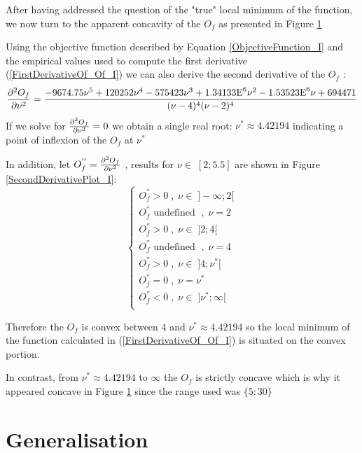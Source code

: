 After having addressed the question of the "true" local minimum of the function, we now turn to the apparent concavity of the $O_f$ as presented in Figure \ref{} \bigskip\par
Using the objective function described by Equation \ref{ObjectiveFunction_I} and the empirical values used to compute the first derivative (\ref{FirstDerivativeOf_Of_I}) we can also derive the second derivative of the $O_f$ :
\begin{equation}\label{SecondDerivativeOf_Of_I}
    \pdv[2]{O_f}{\nu} =  \frac{-9674.75 \nu^5 + 120252 \nu^4 - 575423 \nu^3 + 1.34133\text{E}^6 \nu^2 - 1.53523\text{E}^6 \nu + 694471}{(\nu - 4)^4 (\nu - 2)^4}
\end{equation}
If we solve for $\pdv[2]{O_f}{\nu} = 0$ we obtain a single real root: $\nu^* \approx 4.42194$ indicating a point of inflexion of the $O_f$ at $\nu^*$ 
\smallskip \par
In addition, let $O_f^{''}=\pdv[2]{O_f}{\nu}$ , results for $\nu \in \; [2;5.5]$ are shown in Figure \ref{SecondDerivativePlot_I}:
\begin{equation*}
    \begin{cases}
        O_f^{''} > 0 \; , \; \nu \in \; ]-\infty;2[ \\
        O_f^{''} \text{ undefined } \; , \; \nu = 2 \\
        O_f^{''} > 0 \; , \; \nu \in \; ]2;4[ \\
        O_f^{''} \text{ undefined } \; , \; \nu = 4 \\
        O_f^{''} > 0 \; , \; \nu \in \; ]4;\nu^*[ \\
        O_f^{''} = 0 \; , \; \nu = \nu^* \\
        O_f^{''} < 0 \; , \; \nu \in \; ]\nu^*;\infty[ \\
    \end{cases}
\end{equation*}

Therefore the $O_f$ is convex between $4$ and $\nu^* \approx 4.42194$ so the local minimum of the function calculated in (\ref{FirstDerivativeOf_Of_I}) is situated on the convex portion.
\smallskip\par
In contrast, from $\nu^* \approx 4.42194$ to $\infty$ the $O_f$ is strictly concave which is why it appeared concave in Figure \ref{} since the range used was $\{5:30\}$

\section{Generalisation}

